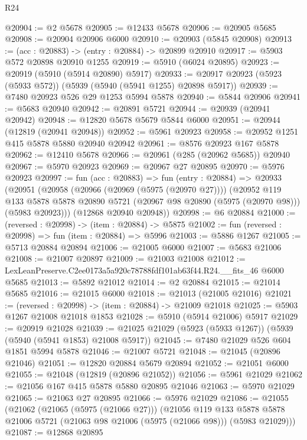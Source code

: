 \begin{lexlean}{R24}
\begin{coremodule}
@20904 := @2 @5678
@20905 := @12433 @5678
@20906 := @20905 @5685
@20908 := @20904 @20906 @6000
@20910 := @20903 (@5845 @20908)
@20913 := (acc : @20883) -> (entry : @20884) -> @20899 @20910
@20917 := @5903 @572 @20898 @20910 @1255
@20919 := @5910 (@6024 @20895)
@20923 := @20919 (@5910 (@5914 @20890) @5917)
@20933 := @20917 @20923 (@5923 (@5933 @572)) (@5939 (@5940 (@5941 @1255) @20898 @5917))
@20939 := @7480 @20923 @526 @29 @1253 @5994 @5878
@20940 := @5844 @20906
@20941 := @5683 @20940
@20942 := @20891 @5721
@20944 := @20939 (@20941 @20942)
@20948 := @12820 @5678 @5679 @5844 @6000
@20951 := @20944 (@12819 (@20941 @20948))
@20952 := @5961 @20923
@20958 := @20952 @1251 @415 @5878 @5880 @20940 @20942
@20961 := @8576 @20923 @167 @5878
@20962 := @12410 @5678
@20966 := @20961 (@285 (@20962 @5685)) @20940
@20967 := @5970 @20923
@20969 := @20967 @27 @20895
@20970 := @5976 @20923
@20997 := fun (acc : @20883) =>
  fun (entry : @20884) =>
  @20933
    (@20951
      (@20958
        (@20966 (@20969 (@5975 (@20970 @27))))
        (@20952
          @119
          @133
          @5878
          @5878
          @20890
          @5721
          (@20967 @98 @20890 (@5975 (@20970 @98)))
          (@5983 @20923)))
      (@12868 @20940 @20948))
@20998 := @6 @20884
@21000 := (reversed : @20998) -> (item : @20884) -> @5875
@21002 := fun (reversed : @20998) => fun (item : @20884) => @5996
@21003 := @5886 @1267
@21005 := @5713 @20884 @20894
@21006 := @21005 @6000
@21007 := @5683 @21006
@21008 := @21007 @20897
@21009 := @21003 @21008
@21012 := LexLeanPreserve.C2ee0173a5a920c78788fdf101ab63f44.R24.__fits_46 @6000 @5685
@21013 := @5892 @21012
@21014 := @2 @20884
@21015 := @21014 @5685
@21016 := @21015 @6000
@21018 := @21013 (@21005 @21016)
@21021 := (reversed : @20998) -> (item : @20884) -> @21009 @21018
@21025 := @5903 @1267 @21008 @21018 @1853
@21028 := @5910 (@5914 @21006) @5917
@21029 := @20919 @21028
@21039 := @21025 @21029 (@5923 (@5933 @1267)) (@5939 (@5940 (@5941 @1853) @21008 @5917))
@21045 := @7480 @21029 @526 @604 @1851 @5994 @5878
@21046 := @21007 @5721
@21048 := @21045 (@20896 @21046)
@21051 := @12820 @20884 @5679 @20894
@21052 := @21051 @6000
@21055 := @21048 (@12819 (@20896 @21052))
@21056 := @5961 @21029
@21062 := @21056 @167 @415 @5878 @5880 @20895 @21046
@21063 := @5970 @21029
@21065 := @21063 @27 @20895
@21066 := @5976 @21029
@21086 := @21055
    (@21062
      (@21065 (@5975 (@21066 @27)))
      (@21056
        @119
        @133
        @5878
        @5878
        @21006
        @5721
        (@21063 @98 @21006 (@5975 (@21066 @98)))
        (@5983 @21029)))
@21087 := @12868 @20895

\end{coremodule}
\end{lexlean}
